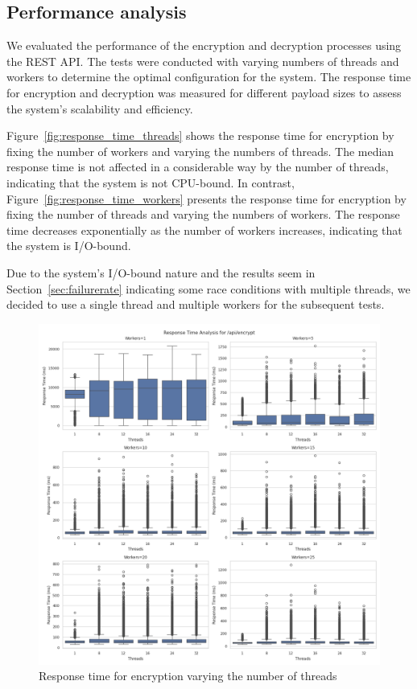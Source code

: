 \documentclass[cic,tc,english]{iiufrgs}
\begin{document}
        \subsection{Performance analysis}
            \label{sec:timeencryptdecrypt}

            We evaluated the performance of the encryption and decryption processes using the REST API. The tests were conducted with varying numbers of threads and workers to determine the optimal configuration for the system. The response time for encryption and decryption was measured for different payload sizes to assess the system's scalability and efficiency.

            

            Figure~\ref{fig:response_time_threads} shows the response time for encryption by fixing the number of workers and varying the numbers of threads. The median response time is not affected in a considerable way by the number of threads, indicating that the system is not CPU-bound. In contrast, Figure~\ref{fig:response_time_workers} presents the response time for encryption by fixing the number of threads and varying the numbers of workers. The response time decreases exponentially as the number of workers increases, indicating that the system is I/O-bound.

            Due to the system's I/O-bound nature and the results seem in Section~\ref{sec:failurerate} indicating some race conditions with multiple threads, we decided to use a single thread and multiple workers for the subsequent tests.

            \begin{figure}
                \centering
                \includegraphics[width=\textwidth]{images/phase1/api_encrypt/response_time_workers_summary.png}
                \caption{Response time for encryption varying the number of threads}
                \label{fig:encrypt_response_time_workers}
            \end{figure}
\end{document}
